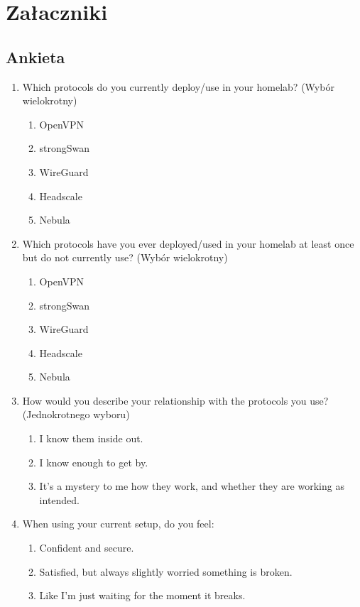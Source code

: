 \section{Załaczniki}

\subsection{Ankieta}

\begin{enumerate}[leftmargin=*]
    \item Which protocols do you currently deploy/use in your homelab? (Wybór wielokrotny)
          \begin{enumerate}[leftmargin=*, label=\alph*)]
              \item OpenVPN
              \item strongSwan
              \item WireGuard
              \item Headscale
              \item Nebula
          \end{enumerate}

    \item Which protocols have you ever deployed/used in your homelab at least once but do not currently use? (Wybór wielokrotny)
          \begin{enumerate}[leftmargin=*, label=\alph*)]
              \item OpenVPN
              \item strongSwan
              \item WireGuard
              \item Headscale
              \item Nebula
          \end{enumerate}

    \item How would you describe your relationship with the protocols you use? (Jednokrotnego wyboru)
          \begin{enumerate}[leftmargin=*, label=\alph*)]
              \item I know them inside out.
              \item I know enough to get by.
              \item It's a mystery to me how they work, and whether they are working as intended.
          \end{enumerate}

    \item When using your current setup, do you feel:
          \begin{enumerate}[leftmargin=*, label=\alph*)]
              \item Confident and secure.
              \item Satisfied, but always slightly worried something is broken.
              \item Like I'm just waiting for the moment it breaks.
          \end{enumerate}


\end{enumerate}
